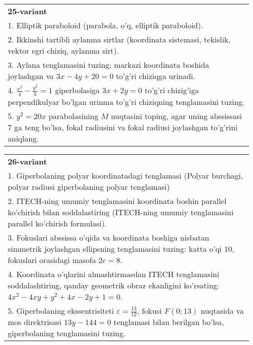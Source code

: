 \documentclass{article}
\begin{document}
\begin{tabular}{m{17cm}}
\textbf{25-variant}\\
1. Elliptik paraboloid (parabola, o'q, elliptik paraboloid).\\

2. Ikkinshi tartibli aylanma sirtlar (koordinata sistemasi, tekislik, vektor egri chiziq, aylanma sirt).\\

3. Aylana tenglamasini tuzing: markazi koordinata boshida joylashgan va $3x-4y+20=0$ to'g'ri chiziqga urinadi.\\

4. $\frac{x^{2}}{4} - \frac{y^{2}}{5} = 1$ giperbolasiga $3x + 2y = 0$ to'g'ri chizig'iga perpendikulyar bo'lgan urinma to'g'ri chiziqning tenglamasini tuzing.\\

5. $y^{2} = 20x$ parabolasining $M$ nuqtasini toping, agar uning abssissasi 7 ga teng bo'lsa, fokal radiusini va fokal radiusi joylashgan to'g'rini aniqlang.
\end{tabular}
\vspace{1cm}


\begin{tabular}{m{17cm}}
\textbf{26-variant}\\
1. Giperbolaning polyar koordinatadagi tenglamasi (Polyar burchagi, polyar radiusi giperbolaning polyar tenglamasi)\\

2. ITECH-ning umumiy tenglamasini koordinata boshin parallel ko'chirish bilan soddalastiring (ITECH-ning umumiy tenglamasini parallel ko'chirish formulasi).\\

3. Fokuslari abssissa o'qida va koordinata boshiga nisbatan simmetrik joylashgan ellipsning tenglamasini tuzing: katta o'qi $10$, fokuslari orasidagi masofa $2c=8$.\\

4. Koordinata o'qlarini almashtirmasdan ITECH tenglamasini soddalashtiring, qanday geometrik obraz ekanligini ko'rsating: $4x^{2} - 4xy + y^{2} + 4x - 2y + 1 = 0$.  \\

5. Giperbolaning ekssentrisiteti $\varepsilon = \frac{13}{12}$, fokusi $F(0;13)$ nuqtasida va mos direktrisasi $13y - 144 = 0$ tenglamasi bilan berilgan bo'lsa, giperbolaning tenglamasini tuzing.  
\end{tabular}
\vspace{1cm}
\end{document}
